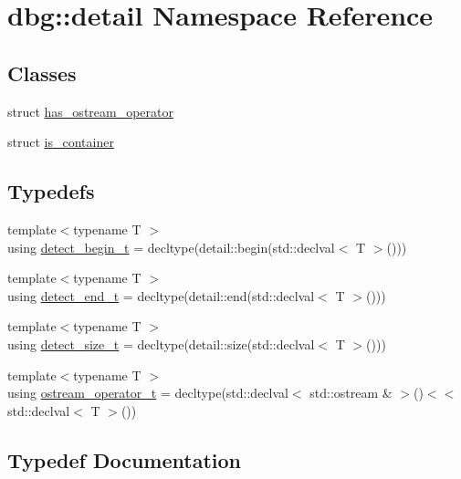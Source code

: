 \hypertarget{namespacedbg_1_1detail}{}\section{dbg\+:\+:detail Namespace Reference}
\label{namespacedbg_1_1detail}
\subsection*{Classes}
\begin{DoxyCompactItemize}
\item 
struct \hyperlink{structdbg_1_1detail_1_1has__ostream__operator}{has\+\_\+ostream\+\_\+operator}
\item 
struct \hyperlink{structdbg_1_1detail_1_1is__container}{is\+\_\+container}
\end{DoxyCompactItemize}
\subsection*{Typedefs}
\begin{DoxyCompactItemize}
\item 
{\footnotesize template$<$typename T $>$ }\\using \hyperlink{namespacedbg_1_1detail_acfad41bd0b116575799b79d85fc5c883}{detect\+\_\+begin\+\_\+t} = decltype(detail\+::begin(std\+::declval$<$ T $>$()))
\item 
{\footnotesize template$<$typename T $>$ }\\using \hyperlink{namespacedbg_1_1detail_ab462e0c9e2d1686d323d638613692839}{detect\+\_\+end\+\_\+t} = decltype(detail\+::end(std\+::declval$<$ T $>$()))
\item 
{\footnotesize template$<$typename T $>$ }\\using \hyperlink{namespacedbg_1_1detail_a19adefcfcaddecb9f32e810ebcae4856}{detect\+\_\+size\+\_\+t} = decltype(detail\+::size(std\+::declval$<$ T $>$()))
\item 
{\footnotesize template$<$typename T $>$ }\\using \hyperlink{namespacedbg_1_1detail_a2c6a2bc0c8581b3b0d285d1d2971e44d}{ostream\+\_\+operator\+\_\+t} = decltype(std\+::declval$<$ std\+::ostream \& $>$()$<$$<$ std\+::declval$<$ T $>$())
\end{DoxyCompactItemize}


\subsection{Typedef Documentation}
\mbox{\label{namespacedbg_1_1detail_acfad41bd0b116575799b79d85fc5c883}} 

